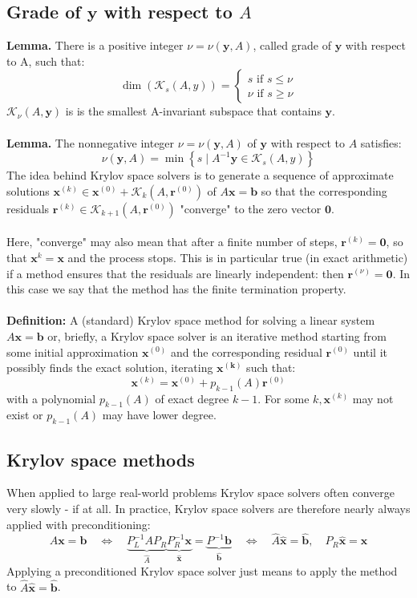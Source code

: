 \documentclass[11pt]{book}
\begin{document}
\subsection*{Grade of $\mathbf{y}$ with respect to $A$}
\textbf{Lemma.} There is a positive integer $\nu=\nu(\mathbf{y}, A)$, called grade of $\mathbf{y}$ with respect to $\mathrm{A}$, such that:
$$
\operatorname{dim}\left(\mathscr{K}_{s}(A, y)\right)=\left\{\begin{array}{l}
s \text { if } s \leq \nu \\
\nu \text { if } s \geq \nu
\end{array}\right.
$$
$\mathscr{K}_{\nu}(A, \mathbf{y})$ is is the smallest $\mathrm{A}$-invariant subspace that contains $\mathbf{y}$.\\ \\
\textbf{Lemma.} The nonnegative integer $\nu=\nu(\mathbf{y}, A)$ of $\mathbf{y}$ with respect to $A$ satisfies:
$$
\nu(\mathbf{y}, A)=\min \left\{s \mid A^{-1} \mathbf{y} \in \mathscr{K}_{s}(A, y)\right\}
$$
The idea behind Krylov space solvers is to generate a sequence of approximate solutions $\mathbf{x}^{(k)} \in \mathbf{x}^{(0)}+\mathscr{K}_{k}\left(A, \mathbf{r}^{(0)}\right)$ of $A \mathbf{x}=\mathbf{b}$ so that the corresponding residuals $\mathbf{r}^{(k)} \in \mathscr{K}_{k+1}\left(A, \mathbf{r}^{(0)}\right)$ "converge" to the zero vector $\mathbf{0}$.\\ \\
Here, "converge" may also mean that after a finite number of steps, $\mathbf{r}^{(k)}=\mathbf{0}$, so that $\mathbf{x}^{k}=\mathbf{x}$ and the process stops. This is in particular true (in exact arithmetic) if a method ensures that the residuals are linearly independent: then $\mathbf{r}^{(\nu)}=\mathbf{0}$. In this case we say that the method has the finite termination property.\\ \\
\textbf{Definition:} A (standard) Krylov space method for solving a linear system $A \mathbf{x}=\mathbf{b}$ or, briefly, a Krylov space solver is an iterative method starting from some initial approximation $\mathbf{x}^{(0)}$ and the corresponding residual $\mathbf{r}^{(0)}$ until it possibly finds the exact solution, iterating $\mathbf{x}^{(\mathbf{k})}$ such that:
$$
\mathbf{x}^{(k)}=\mathbf{x}^{(0)}+p_{k-1}(A) \mathbf{r}^{(0)}
$$
with a polynomial $p_{k-1}(A)$ of exact degree $k-1$. For some $k, \mathbf{x}^{(k)}$ may not exist or $p_{k-1}(A)$ may have lower degree.
\subsection*{Krylov space methods}
When applied to large real-world problems Krylov space solvers often converge very slowly - if at all. In practice, Krylov space solvers are therefore nearly always applied with preconditioning:
$$
A \mathbf{x}=\mathbf{b} \quad \Longleftrightarrow \quad \underbrace{P^{-1}_L A P_R}_{\hat{A}} \underbrace{P^{-1}_R\mathbf{x}}_{\hat{\mathbf{x}}}=\underbrace{P^{-1} \mathbf{b}}_{\hat{\mathbf{b}}} \quad \Longleftrightarrow \quad \hat{A} \hat{\mathbf{x}}=\hat{\mathbf{b}}, \quad P_R \hat{\mathbf{x}}=\mathbf{x}
$$
Applying a preconditioned Krylov space solver just means to apply the method to $\hat{A} \hat{\mathbf{x}}=\hat{\mathbf{b}}$.
\end{document}
